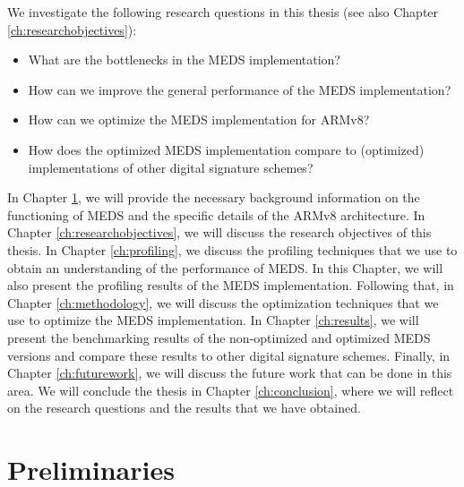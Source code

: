 \documentclass[11pt,a4paper]{report}
\theoremstyle{definition}
\begin{document}
We investigate the following research questions in this thesis (see also Chapter \ref{ch:researchobjectives}):
\begin{itemize}
  \item What are the bottlenecks in the MEDS implementation?
  \item How can we improve the general performance of the MEDS implementation?
  \item How can we optimize the MEDS implementation for ARMv8?
  \item How does the optimized MEDS implementation compare to (optimized) implementations of other digital signature schemes?
\end{itemize}

In Chapter \ref{ch:preliminaries}, we will provide the necessary background information on the functioning of MEDS and the specific details of the ARMv8 architecture. In Chapter \ref{ch:researchobjectives}, we will discuss the research objectives of this thesis. In Chapter \ref{ch:profiling}, we discuss the profiling techniques that we use to obtain an understanding of the performance of MEDS. In this Chapter, we will also present the profiling results of the MEDS implementation. Following that, in Chapter \ref{ch:methodology}, we will discuss the optimization techniques that we use to optimize the MEDS implementation. In Chapter \ref{ch:results}, we will present the benchmarking results of the non-optimized and optimized MEDS versions and compare these results to other digital signature schemes. Finally, in Chapter \ref{ch:futurework}, we will discuss the future work that can be done in this area. We will conclude the thesis in Chapter \ref{ch:conclusion}, where we will reflect on the research questions and the results that we have obtained.

\chapter{Preliminaries}
\label{ch:preliminaries}
\end{document}

